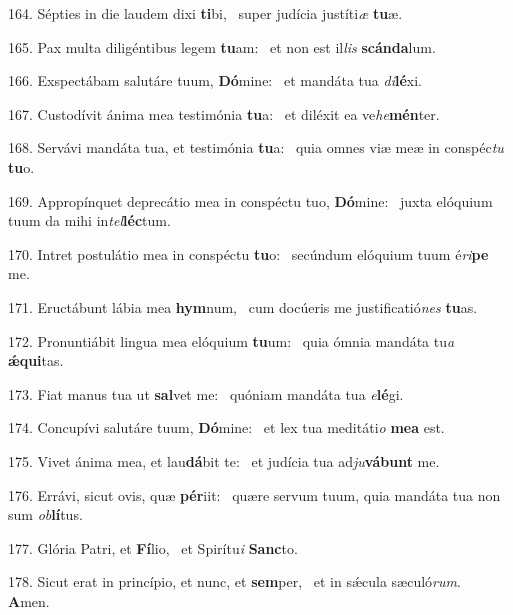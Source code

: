 164. Sépties in die laudem dixi \textbf{ti}bi, \ast\  super judícia justíti\textit{æ} \textbf{tu}æ.\

165. Pax multa diligéntibus legem \textbf{tu}am: \ast\  et non est il\textit{lis} \textbf{scán}\textbf{da}lum.\

166. Exspectábam salutáre tuum, \textbf{Dó}mine: \ast\  et mandáta tua \textit{di}\textbf{lé}xi.\

167. Custodívit ánima mea testimónia \textbf{tu}a: \ast\  et diléxit ea ve\textit{he}\textbf{mén}ter.\

168. Servávi mandáta tua, et testimónia \textbf{tu}a: \ast\  quia omnes viæ meæ in conspéc\textit{tu} \textbf{tu}o.\

169. Appropínquet deprecátio mea in conspéctu tuo, \textbf{Dó}mine: \ast\  juxta elóquium tuum da mihi in\textit{tel}\textbf{léc}tum.\

170. Intret postulátio mea in conspéctu \textbf{tu}o: \ast\  secúndum elóquium tuum é\textit{ri}\textbf{pe} me.\

171. Eructábunt lábia mea \textbf{hym}num, \ast\  cum docúeris me justificatió\textit{nes} \textbf{tu}as.\

172. Pronuntiábit lingua mea elóquium \textbf{tu}um: \ast\  quia ómnia mandáta tu\textit{a} \textbf{ǽ}\textbf{qui}tas.\

173. Fiat manus tua ut \textbf{sal}vet me: \ast\  quóniam mandáta tua \textit{e}\textbf{lé}gi.\

174. Concupívi salutáre tuum, \textbf{Dó}mine: \ast\  et lex tua meditáti\textit{o} \textbf{me}\textbf{a} est.\

175. Vivet ánima mea, et lau\textbf{dá}bit te: \ast\  et judícia tua ad\textit{ju}\textbf{vá}\textbf{bunt} me.\

176. Errávi, sicut ovis, quæ \textbf{pér}iit: \ast\  quære servum tuum, quia mandáta tua non sum \textit{ob}\textbf{lí}tus.\

177. Glória Patri, et \textbf{Fí}lio, \ast\  et Spirítu\textit{i} \textbf{Sanc}to.\

178. Sicut erat in princípio, et nunc, et \textbf{sem}per, \ast\  et in sǽcula sæculó\textit{rum}. \textbf{A}men.\

